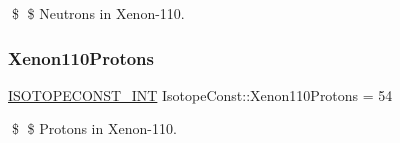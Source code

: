 \$ \$ Neutrons in Xenon-\/110. \mbox{\label{group___isotope_const-_xenon-_xe110_ga75d7edfc531fdb416aa352b7b1328c2e}} 
\subsubsection{\texorpdfstring{Xenon110\+Protons}{Xenon110Protons}}
{\footnotesize\ttfamily \mbox{\hyperlink{group___isotope_const-_macros_ga5f18360b3e99483a35c32d789e62621c}{I\+S\+O\+T\+O\+P\+E\+C\+O\+N\+S\+T\+\_\+\+I\+NT}} Isotope\+Const\+::\+Xenon110\+Protons = 54}

\$ \$ Protons in Xenon-\/110. 